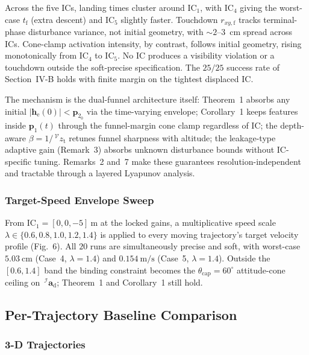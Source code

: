 \documentclass[10pt,journal]{IEEEtran}
\begin{document}
Across the five ICs, landing times cluster around IC$_1$, with IC$_4$ giving the worst-case $t_\text{f}$ (extra descent) and IC$_5$ slightly faster. Touchdown $r_{xy,\text{f}}$ tracks terminal-phase disturbance variance, not initial geometry, with $\sim 2$--$3$~cm spread across ICs. Cone-clamp activation intensity, by contrast, follows initial geometry, rising monotonically from IC$_4$ to IC$_5$. No IC produces a visibility violation or a touchdown outside the soft-precise specification. The $25/25$ success rate of Section~IV-B holds with finite margin on the tightest displaced IC.

The mechanism is the dual-funnel architecture itself: Theorem~1 absorbs any initial $|\boldsymbol{h}_\text{e}(0)|<\boldsymbol{p}_{2_0}$ via the time-varying envelope; Corollary~1 keeps features inside $\boldsymbol{p}_1(t)$ through the funnel-margin cone clamp regardless of IC; the depth-aware $\beta=1/\,^\mathcal{V}z_\text{t}$ retunes funnel sharpness with altitude; the leakage-type adaptive gain (Remark~3) absorbs unknown disturbance bounds without IC-specific tuning. Remarks~2 and~7 make these guarantees resolution-independent and tractable through a layered Lyapunov analysis.

\subsubsection{Target-Speed Envelope Sweep}
\label{sec:sup-speed}

From IC$_1=[0,0,-5]~\text{m}$ at the locked gains, a multiplicative speed scale $\lambda\in\{0.6,0.8,1.0,1.2,1.4\}$ is applied to every moving trajectory's target velocity profile (Fig.~6). All $20$ runs are simultaneously precise and soft, with worst-case $5.03~\text{cm}$ (Case~4, $\lambda=1.4$) and $0.154~\text{m/s}$ (Case~5, $\lambda=1.4$). Outside the $[0.6,1.4]$ band the binding constraint becomes the $\theta_\text{cap}=60^\circ$ attitude-cone ceiling on $\,^\mathcal{I}\boldsymbol{a}_\text{d}$; Theorem~1 and Corollary~1 still hold.

\subsection{Per-Trajectory Baseline Comparison}
\label{sec:sup-comparison-3d}

\subsubsection{3-D Trajectories}
\end{document}
